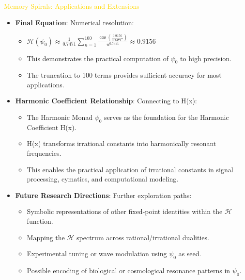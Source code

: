 \textcolor{gold}{ Memory Spirals: Applications and Extensions } \\
\begin{itemize}
    \item \texttt{} \textbf{Final Equation}: Numerical resolution:
    \begin{itemize}
        \item $\mathcal{H}(\psi_0) \approx \frac{1}{0.7471} \sum_{n=1}^{100} \frac{\cos\left(\frac{0.9156}{0.7471^n}\right)}{n^{0.7471}} \approx 0.9156$
        \item This demonstrates the practical computation of $\psi_0$ to high precision.
        \item The truncation to 100 terms provides sufficient accuracy for most applications.
    \end{itemize}
    
    \item \texttt{} \textbf{Harmonic Coefficient Relationship}: Connecting to H(x):
    \begin{itemize}
        \item The Harmonic Monad $\psi_0$ serves as the foundation for the Harmonic Coefficient H(x).
        \item H(x) transforms irrational constants into harmonically resonant frequencies.
        \item This enables the practical application of irrational constants in signal processing, cymatics, and computational modeling.
    \end{itemize}
    
    \item \texttt{} \textbf{Future Research Directions}: Further exploration paths:
    \begin{itemize}
        \item Symbolic representations of other fixed-point identities within the $\mathcal{H}$ function.
        \item Mapping the $\mathcal{H}$ spectrum across rational/irrational dualities.
        \item Experimental tuning or wave modulation using $\psi_0$ as seed.
        \item Possible encoding of biological or cosmological resonance patterns in $\psi_0$.
    \end{itemize}
    

\end{itemize}
